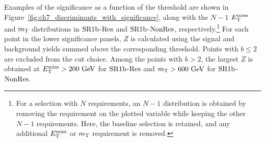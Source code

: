 Examples of the significance as a function of the threshold are shown in Figure~\ref{fig:ch7_discriminants_with_significance}, along with the $N-1$ $E_{\mathrm{T}}^{\mathrm{miss}}$ and $m_{\mathrm{T}}$ distributions in $\mathrm{SR1b}$-$\mathrm{Res}$ and $\mathrm{SR1b}$-$\mathrm{NonRes}$, respectively.\footnote{For a selection with $N$ requirements, an $N-1$ distribution is obtained by removing the requirement on the plotted variable while keeping the other $N-1$ requirements. Here, the baseline selection is retained, and any additional $E_{\mathrm{T}}^{\mathrm{miss}}$ or $m_{\mathrm{T}}$ requirement is removed.}
For each point in the lower significance panels, $Z$ is calculated using the signal and background yields summed above the corresponding threshold. Points with $b\leq2$ are excluded from the cut choice.
Among the points with $b>2$, the largest $Z$ is obtained at $E_{\mathrm{T}}^{\mathrm{miss}}>200~\mathrm{GeV}$ for $\mathrm{SR1b}$-$\mathrm{Res}$ and $m_{\mathrm{T}}>600~\mathrm{GeV}$ for $\mathrm{SR1b}$-$\mathrm{NonRes}$.



